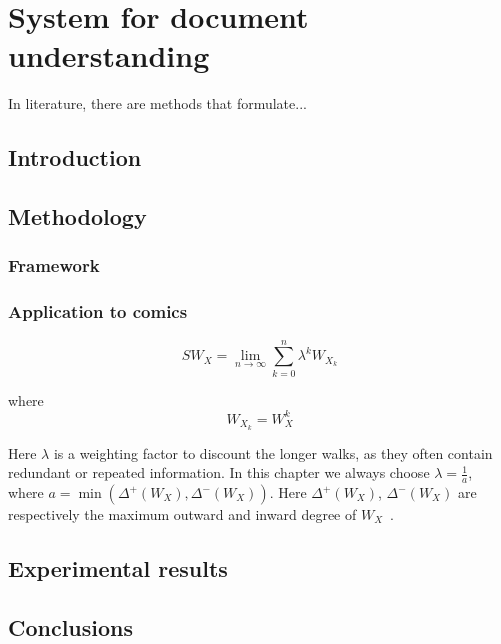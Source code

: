 \chapter{System for document understanding} %
\label{chap:hp}
\graphicspath{{./chapters/8-hp/figs/}}

In literature, there are methods that formulate...

\section{Introduction}
\label{sec:hp:intro}


\section{Methodology}
\label{sec:hp:method}


\subsection{Framework}
\label{sub:hp:rw}


\subsection{Application to comics} %
\label{sub:hp:application_to_comics}


\begin{equation}
SW_X=\lim_{n\rightarrow \infty}\sum_{k=0}^n \lambda^k W_{X_k}
\label{eqn:pg:rw1}
\end{equation}

where
\begin{equation}
W_{X_k} = W_X^k
\end{equation}

Here $\lambda$ is a weighting factor to discount the longer walks, as they often contain redundant or repeated information. In this chapter we always choose $\lambda=\frac{1}{a}$, where $a=\min(\Delta^+(W_X),\Delta^-(W_X))$. Here $\Delta^+(W_X)$, $\Delta^-(W_X)$ are respectively the maximum outward and inward degree of $W_X$~\cite{Gartner2003a}.

\section{Experimental results} %
\label{sec:hp:experimental_results}


\section{Conclusions}
\label{sec:hp:conclusion}
